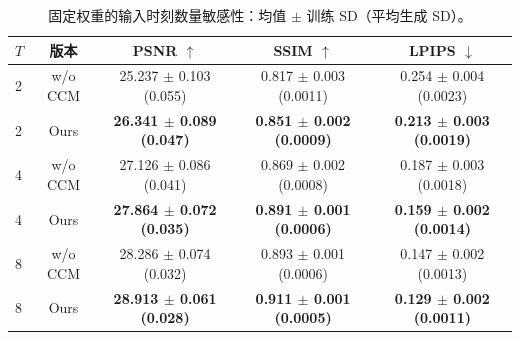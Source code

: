\begin{table}[H]
\centering\small
\setlength{\tabcolsep}{4pt}
\caption{固定权重的输入时刻数量敏感性：均值 $\pm$ 训练 SD（平均生成 SD）。}
\label{tab:seed-inputs}
\begin{tabular}{@{}lcccc@{}}
\toprule
$T$ & 版本 & PSNR $\uparrow$ & SSIM $\uparrow$ & LPIPS $\downarrow$ \\
\midrule
2 & w/o CCM & 25.237 $\pm$ 0.103 (0.055) & 0.817 $\pm$ 0.003 (0.0011) & 0.254 $\pm$ 0.004 (0.0023) \\
2 & Ours & \textbf{26.341 $\pm$ 0.089 (0.047)} & \textbf{0.851 $\pm$ 0.002 (0.0009)} & \textbf{0.213 $\pm$ 0.003 (0.0019)} \\
4 & w/o CCM & 27.126 $\pm$ 0.086 (0.041) & 0.869 $\pm$ 0.002 (0.0008) & 0.187 $\pm$ 0.003 (0.0018) \\
4 & Ours & \textbf{27.864 $\pm$ 0.072 (0.035)} & \textbf{0.891 $\pm$ 0.001 (0.0006)} & \textbf{0.159 $\pm$ 0.002 (0.0014)} \\
8 & w/o CCM & 28.286 $\pm$ 0.074 (0.032) & 0.893 $\pm$ 0.001 (0.0006) & 0.147 $\pm$ 0.002 (0.0013) \\
8 & Ours & \textbf{28.913 $\pm$ 0.061 (0.028)} & \textbf{0.911 $\pm$ 0.001 (0.0005)} & \textbf{0.129 $\pm$ 0.002 (0.0011)} \\
\bottomrule
\end{tabular}
\end{table}
